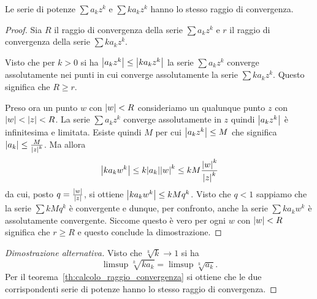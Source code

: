 \begin{theorem}
\label{th:raggio_serie_derivate}
Le serie di potenze $\sum a_k z^k$ e $\sum k a_k z^k$ hanno
lo stesso raggio di convergenza.
\end{theorem}
%
\begin{proof}
  Sia $R$ il raggio di convergenza della serie $\sum a_k z^k$ 
  e $r$ il raggio di convergenza della serie $\sum k a_k z^k$.
  
  Visto che per $k>0$ si ha ${\left|a_k z^k\right|} \le {\left|k a_k z^k\right|}$
  la serie $\sum a_k z^k$ converge assolutamente nei punti 
  in cui converge assolutamente la serie $\sum k a_k z^k$.
  Questo significa che $R\ge r$.

  Preso ora un punto $w$ con ${\left|w\right|}<R$ consideriamo un
  qualunque punto $z$ con ${\left|w\right|}<{\left|z\right|}<R$.
  La serie $\sum a_k z^k$ converge assolutamente in $z$ 
  quindi ${\left|a_k z^k\right|}$ è infinitesima e limitata.
  Esiste quindi $M$ per cui ${\left|a_k z^k\right|}\le M$ 
  che significa ${\left|a_k\right|} \le \frac{M}{{\left|z\right|}^k}$.
  Ma allora 
  \[
    {\left|k a_k w^k\right|} 
    \le k {\left|a_k\right|} {\left|w\right|}^k
    \le k M \frac{{\left|w\right|}^k}{{\left|z\right|}^k}
  \]
  da cui, posto $q=\frac{{\left|w\right|}}{{\left|z\right|}}$, si ottiene 
  ${\left|k a_k w^k\right|} \le k M q^k$. 
  Visto che $q<1$ sappiamo che la serie $\sum k M q^k$ 
  è convergente e dunque, per confronto, anche la 
  serie $\sum k a_k w^k$ è assolutamente convergente.
  Siccome questo è vero per ogni $w$ con ${\left|w\right|}<R$
  significa che $r\ge R$ e questo conclude la dimostrazione.
\end{proof}
%
\begin{proof}[Dimostrazione alternativa]
Visto che $\sqrt[k]{k}\to 1$ si ha
\[
  \limsup \sqrt[k]{k a_k} = \limsup \sqrt[k]{a_k}.
\]
Per il teorema~\ref{th:calcolo_raggio_convergenza} si ottiene
che le due corrispondenti serie di potenze hanno lo stesso raggio di convergenza.
\end{proof}

